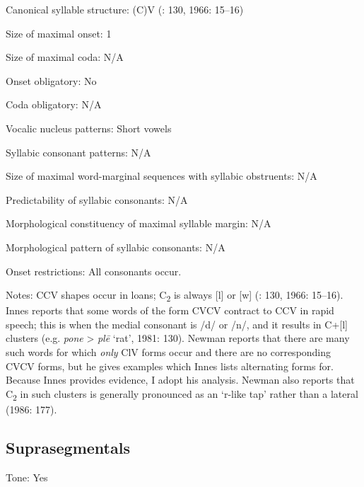 {\begin{appendixdesc}
\item[Canonical syllable structure:] (C)V (\citealt{Innes1981}: 130, 1966: 15--16)

\item[Size of maximal onset:] 1

\item[Size of maximal coda:] N/A

\item[Onset obligatory:] No

\item[Coda obligatory:] N/A

\item[Vocalic nucleus patterns:] Short vowels

\item[Syllabic consonant patterns:] N/A

\item[Size of maximal word-marginal sequences with syllabic obstruents:] N/A

\item[Predictability of syllabic consonants:] N/A

\item[Morphological constituency of maximal syllable margin:] N/A

\item[Morphological pattern of syllabic consonants:] N/A

\item[Onset restrictions:] All consonants occur.

\item[Notes:] CCV shapes occur in loans; C\textsubscript{2} is always [l] or [w] (\citealt{Innes1981}: 130, 1966: 15--16). Innes reports that some words of the form CVCV contract to CCV in rapid speech; this is when the medial consonant is /d/ or /n/, and it results in C+[l] clusters (e.g. \textit{pone} > \textit{plē} ‘rat’, 1981: 130). Newman reports that there are many such words for which \textit{only} ClV forms occur and there are no corresponding CVCV forms, but he gives examples which Innes lists alternating forms for. Because Innes provides evidence, I adopt his analysis. Newman also reports that C\textsubscript{2} in such clusters is generally pronounced as an ‘r-like tap’ rather than a lateral (1986: 177).
\end{appendixdesc}
\subsection*{Suprasegmentals}
\begin{appendixdesc}
\item[Tone:] Yes


\end{appendixdesc}}
